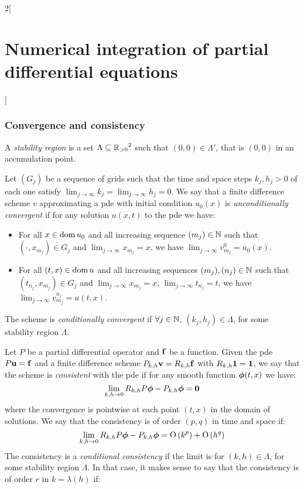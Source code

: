 \documentclass[../../../main_math.tex]{subfiles}
\begin{document}
\begin{multicols}{2}[\section{Numerical integration of partial differential equations}]
  \subsubsection{Convergence and consistency}
  \begin{definition}
    A \emph{stability region} is a set $\Lambda\subseteq{\ensuremath{\mathbb{R}}_{>0}}^2$ such that $(0,0)\in\Lambda'$, that is $(0,0)$ in an accumulation point.
  \end{definition}
  \begin{definition}
    Let $(G_j)$ be a sequence of grids such that the time and space steps $k_j,h_j>0$ of each one satisfy $\displaystyle \lim_{j\to\infty}k_j=\lim_{j\to\infty}h_j=0$.
    We say that a finite difference scheme $v$ approximating a pde with initial condition $u_0(x)$ is \emph{unconditionally convergent} if for any solution $u(x,t)$ to the pde we have:
    \begin{itemize}
      \item For all $x\in\operatorname{dom} u_0$ and all increasing sequence $(m_j)\in\mathbb{N}$ such that $(\cdot,x_{m_j})\in G_j$ and $\displaystyle\lim_{j\to\infty} x_{m_j}=x$, we have $\displaystyle\lim_{j\to\infty} v_{m_j}^0=u_0(x)$.
      \item For all $(t,x)\in\operatorname{dom} u$ and all increasing sequences $(m_j),(n_j)\in\mathbb{N}$ such that $(t_{n_j},x_{m_j})\in G_j$ and $\displaystyle\lim_{j\to\infty} x_{m_j}=x$, $\displaystyle\lim_{j\to\infty} t_{n_j}=t$, we have $\displaystyle\lim_{j\to\infty} v_{m_j}^{n_j}=u(t,x)$.
    \end{itemize}
    The scheme is \emph{conditionally convergent} if $\forall j\in\mathbb{N}$, $(k_j,h_j)\in\Lambda$, for some stability region $\Lambda$.
  \end{definition}
  \begin{definition}
    Let $P$ be a partial differential operator and $\boldsymbol{\mathrm{f}}$ be a function. Given the pde $P\boldsymbol{\mathrm{u}}=\boldsymbol{\mathrm{f}}$ and a finite difference scheme $P_{k,h}\boldsymbol{\mathrm{v}}=R_{k,h}\boldsymbol{\mathrm{f}}$ with $R_{k,h}\boldsymbol{\mathrm{1}}=\boldsymbol{\mathrm{1}}$, we say that the scheme is \emph{consistent} with the pde if for any smooth function $\boldsymbol{\mathrm{\phi}}(t,x)$ we have: $$\lim_{k,h\to 0}R_{k,h}P\boldsymbol{\mathrm{\phi}}-P_{k,h}\boldsymbol{\mathrm{\phi}}=\boldsymbol{\mathrm{0}}$$
    where the convergence is pointwise at each point $(t,x)$ in the domain of solutions. We say that the consistency is of order $(p,q)$ in time and space if: $$\lim_{k,h\to 0}R_{k,h}P\boldsymbol{\mathrm{\phi}}-P_{k,h}\boldsymbol{\mathrm{\phi}}=\mathrm{O}\left(k^p\right)+\mathrm{O}\left(h^q\right)$$  The consistency is a \emph{conditional consistency} if the limit is for $(k,h)\in \Lambda$, for some stability region $\Lambda$. In that case, it makes sense to say that the consistency is of order $r$ in $k=\lambda(h)$ if:

\end{definition}
\end{multicols}
\end{document}
